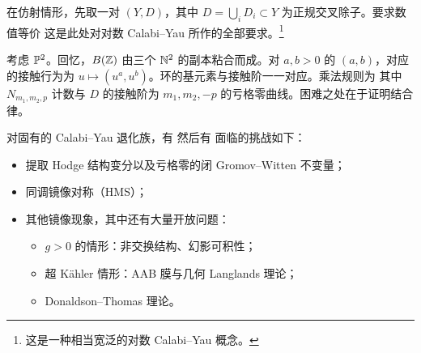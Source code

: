 在仿射情形，先取一对 $(Y,D)$，其中 $D=\bigcup_iD_i\subset Y$ 为正规交叉除子。要求数值等价
这是此处对对数 Calabi–Yau 所作的全部要求。\footnote{这是一种相当宽泛的对数 Calabi–Yau 概念。}
\begin{example}\label{ex:5.8}
考虑 $\mathbb P^2$。回忆，$B(\mathbb Z)$ 由三个 $\mathbb N^2$ 的副本粘合而成。对 $a,b>0$ 的 $(a,b)$，对应的接触行为为 $u\mapsto(u^a,u^b)$。环的基元素与接触阶一一对应。乘法规则为
其中 $N_{m_1,m_2,p}$ 计数与 $D$ 的接触阶为 $m_1,m_2,-p$ 的亏格零曲线。困难之处在于证明结合律。
\end{example}
对固有的 Calabi–Yau 退化族，有
然后有
面临的挑战如下：
\begin{itemize}
\item 提取 Hodge 结构变分以及亏格零的闭 Gromov–Witten 不变量；
\item 同调镜像对称（HMS）；
\item 其他镜像现象，其中还有大量开放问题：
\begin{itemize}
\item $g>0$ 的情形：非交换结构、幻影可积性；
\item 超 Kähler 情形：AAB 膜与几何 Langlands 理论；
\item Donaldson–Thomas 理论。
\end{itemize}
\end{itemize}
